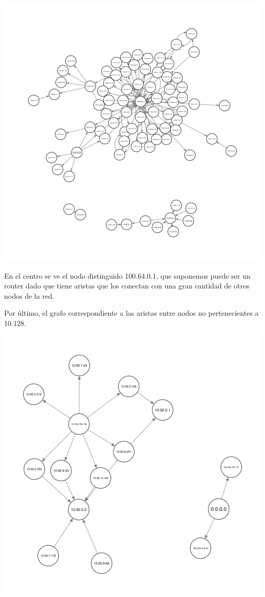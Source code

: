 \begin{center}
\includegraphics[scale=0.6]{../img/biblio-grafo-red-100-64.png}
\end{center}

En el centro se ve el nodo distinguido 100.64.0.1, que suponemos puede
ser un router dado que tiene aristas que los conectan con una gran
cantidad de otros nodos de la red. 

Por último, el grafo correspondiente a las aristas entre nodos no
pertenecientes a 10.128.

\begin{center}
\includegraphics[scale=0.6]{../img/biblio-grafo-red-10-92.png}
\end{center}


